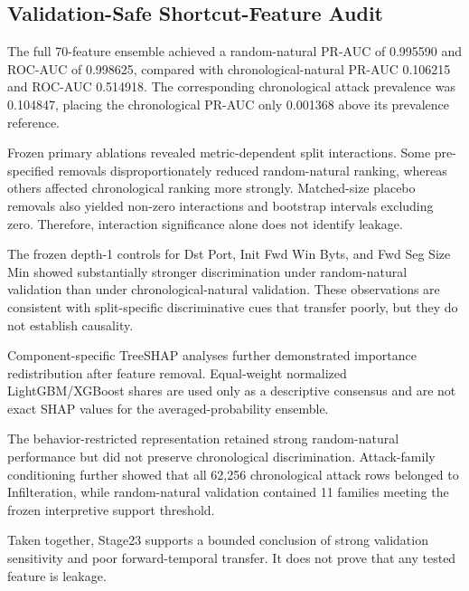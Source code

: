 

\subsection{Validation-Safe Shortcut-Feature Audit}

The full 70-feature ensemble achieved a random-natural PR-AUC of
0.995590 and ROC-AUC of 0.998625,
compared with chronological-natural PR-AUC 0.106215
and ROC-AUC 0.514918. The corresponding chronological
attack prevalence was 0.104847, placing the chronological PR-AUC only
0.001368 above its prevalence
reference.

Frozen primary ablations revealed metric-dependent split interactions. Some
pre-specified removals disproportionately reduced random-natural ranking, whereas
others affected chronological ranking more strongly. Matched-size placebo removals
also yielded non-zero interactions and bootstrap intervals excluding zero. Therefore,
interaction significance alone does not identify leakage.

The frozen depth-1 controls for Dst Port, Init Fwd Win Byts, and Fwd Seg Size Min
showed substantially stronger discrimination under random-natural validation than
under chronological-natural validation. These observations are consistent with
split-specific discriminative cues that transfer poorly, but they do not establish
causality.

Component-specific TreeSHAP analyses further demonstrated importance redistribution
after feature removal. Equal-weight normalized LightGBM/XGBoost shares are used only
as a descriptive consensus and are not exact SHAP values for the averaged-probability
ensemble.

The behavior-restricted representation retained strong random-natural performance but
did not preserve chronological discrimination. Attack-family conditioning further
showed that all 62,256 chronological attack rows belonged to
Infilteration, while random-natural validation contained 11 families meeting the frozen
interpretive support threshold.

Taken together, Stage23 supports a bounded conclusion of strong validation sensitivity
and poor forward-temporal transfer. It does not prove that any tested feature is leakage.
